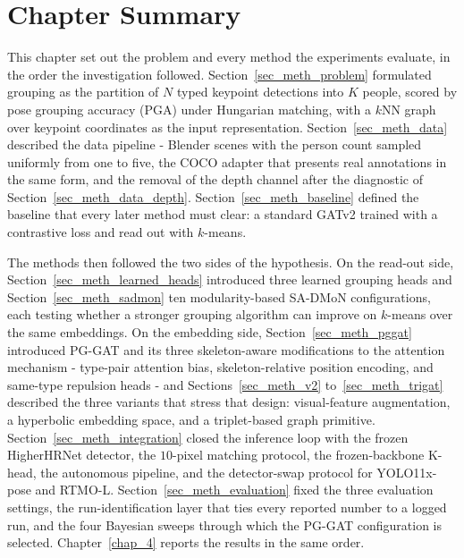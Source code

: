 \section{Chapter Summary}
\label{sec_meth_summary}

This chapter set out the problem and every method the experiments evaluate, in the order the investigation followed.
Section~\ref{sec_meth_problem} formulated grouping as the partition of $N$ typed keypoint detections into $K$ people,
scored by pose grouping accuracy (PGA) under Hungarian matching,
with a $k$NN graph over keypoint coordinates as the input representation.
Section~\ref{sec_meth_data} described the data pipeline -
Blender scenes with the person count sampled uniformly from one to five,
the COCO adapter that presents real annotations in the same form,
and the removal of the depth channel after the diagnostic of Section~\ref{sec_meth_data_depth}.
Section~\ref{sec_meth_baseline} defined the baseline that every later method must clear:
a standard GATv2 trained with a contrastive loss and read out with $k$-means.

The methods then followed the two sides of the hypothesis.
On the read-out side,
Section~\ref{sec_meth_learned_heads} introduced three learned grouping heads
and Section~\ref{sec_meth_sadmon} ten modularity-based SA-DMoN configurations,
each testing whether a stronger grouping algorithm can improve on $k$-means over the same embeddings.
On the embedding side,
Section~\ref{sec_meth_pggat} introduced PG-GAT and its three skeleton-aware modifications to the attention mechanism -
type-pair attention bias, skeleton-relative position encoding, and same-type repulsion heads -
and Sections~\ref{sec_meth_v2} to~\ref{sec_meth_trigat} described the three variants that stress that design:
visual-feature augmentation, a hyperbolic embedding space, and a triplet-based graph primitive.
Section~\ref{sec_meth_integration} closed the inference loop with the frozen HigherHRNet detector,
the $10$-pixel matching protocol,
the frozen-backbone K-head,
the autonomous pipeline,
and the detector-swap protocol for YOLO11x-pose and RTMO-L.
Section~\ref{sec_meth_evaluation} fixed the three evaluation settings,
the run-identification layer that ties every reported number to a logged run,
and the four Bayesian sweeps through which the PG-GAT configuration is selected.
Chapter~\ref{chap_4} reports the results in the same order.
